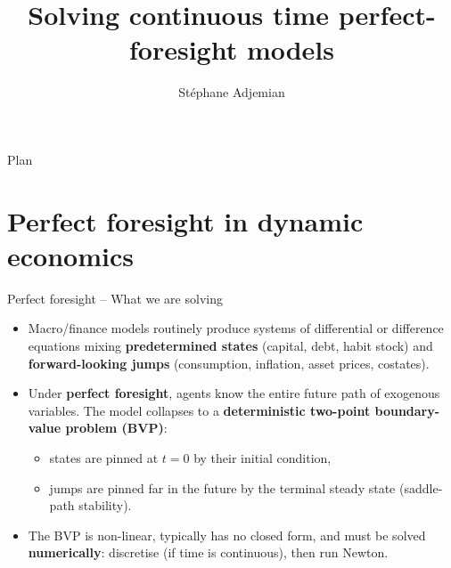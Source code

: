\documentclass[11pt,aspectratio=169]{beamer}
\title{Solving continuous time perfect-foresight models}
\author{Stéphane Adjemian}
\institute{Université du Mans}
\begin{document}
\begin{frame}
\titlepage
\end{frame}


\begin{frame}{Plan}
\tableofcontents
\end{frame}

\section{Perfect foresight in dynamic economics}

\begin{frame}{Perfect foresight -- What we are solving}

\begin{itemize}

\item Macro/finance models routinely produce systems of differential
  or difference equations mixing \textbf{predetermined states}
  (capital, debt, habit stock) and \textbf{forward-looking jumps}
  (consumption, inflation, asset prices, costates).\newline

\item Under \textbf{perfect foresight}, agents know the entire future
  path of exogenous variables. The model collapses to a
  \textbf{deterministic two-point boundary-value problem (BVP)}:\newline
  \begin{itemize}
  \item states are pinned at $t=0$ by their initial condition,\newline
  \item jumps are pinned far in the future by the terminal steady
    state (saddle-path stability).
  \end{itemize}

\medskip
  
\item The BVP is non-linear, typically has no closed form, and must be
  solved \textbf{numerically}: discretise (if time is continuous), then run Newton.

\end{itemize}

\end{frame}
\end{document}
